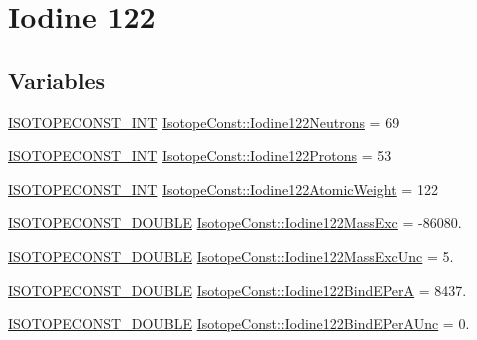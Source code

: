 \hypertarget{group___isotope_const-_iodine-_i122}{}\section{Iodine 122}
\label{group___isotope_const-_iodine-_i122}
\subsection*{Variables}
\begin{DoxyCompactItemize}
\item 
\mbox{\hyperlink{group___isotope_const-_macros_ga5f18360b3e99483a35c32d789e62621c}{I\+S\+O\+T\+O\+P\+E\+C\+O\+N\+S\+T\+\_\+\+I\+NT}} \mbox{\hyperlink{group___isotope_const-_iodine-_i122_ga962e8a863cadca3095e5179a16b478cb}{Isotope\+Const\+::\+Iodine122\+Neutrons}} = 69
\item 
\mbox{\hyperlink{group___isotope_const-_macros_ga5f18360b3e99483a35c32d789e62621c}{I\+S\+O\+T\+O\+P\+E\+C\+O\+N\+S\+T\+\_\+\+I\+NT}} \mbox{\hyperlink{group___isotope_const-_iodine-_i122_gab79b2dc8150be38c94795eca7e38c87c}{Isotope\+Const\+::\+Iodine122\+Protons}} = 53
\item 
\mbox{\hyperlink{group___isotope_const-_macros_ga5f18360b3e99483a35c32d789e62621c}{I\+S\+O\+T\+O\+P\+E\+C\+O\+N\+S\+T\+\_\+\+I\+NT}} \mbox{\hyperlink{group___isotope_const-_iodine-_i122_gaa907887d384dbbc1481aec6a483162fb}{Isotope\+Const\+::\+Iodine122\+Atomic\+Weight}} = 122
\item 
\mbox{\hyperlink{group___isotope_const-_macros_ga8f45a7272ce02c0b4c65c44636ed719a}{I\+S\+O\+T\+O\+P\+E\+C\+O\+N\+S\+T\+\_\+\+D\+O\+U\+B\+LE}} \mbox{\hyperlink{group___isotope_const-_iodine-_i122_gafec41c5dfe543f3d3d243b6f782679cf}{Isotope\+Const\+::\+Iodine122\+Mass\+Exc}} = -\/86080.
\item 
\mbox{\hyperlink{group___isotope_const-_macros_ga8f45a7272ce02c0b4c65c44636ed719a}{I\+S\+O\+T\+O\+P\+E\+C\+O\+N\+S\+T\+\_\+\+D\+O\+U\+B\+LE}} \mbox{\hyperlink{group___isotope_const-_iodine-_i122_ga84dcdb81bea926ca54c27ab0326a6333}{Isotope\+Const\+::\+Iodine122\+Mass\+Exc\+Unc}} = 5.
\item 
\mbox{\hyperlink{group___isotope_const-_macros_ga8f45a7272ce02c0b4c65c44636ed719a}{I\+S\+O\+T\+O\+P\+E\+C\+O\+N\+S\+T\+\_\+\+D\+O\+U\+B\+LE}} \mbox{\hyperlink{group___isotope_const-_iodine-_i122_ga985cd917178c8d7c9e32675ee7da3c8b}{Isotope\+Const\+::\+Iodine122\+Bind\+E\+PerA}} = 8437.
\item 
\mbox{\hyperlink{group___isotope_const-_macros_ga8f45a7272ce02c0b4c65c44636ed719a}{I\+S\+O\+T\+O\+P\+E\+C\+O\+N\+S\+T\+\_\+\+D\+O\+U\+B\+LE}} \mbox{\hyperlink{group___isotope_const-_iodine-_i122_ga967eb10a0cd1b378d94267194d747124}{Isotope\+Const\+::\+Iodine122\+Bind\+E\+Per\+A\+Unc}} = 0.

\end{DoxyCompactItemize}
